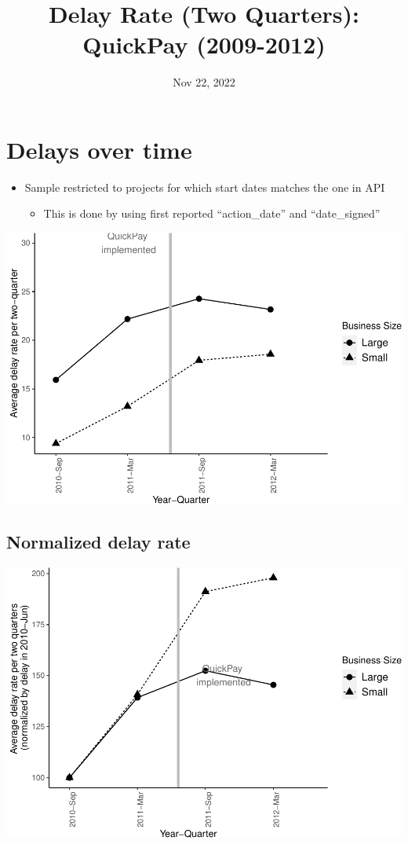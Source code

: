 \documentclass[
]{article}
\title{Delay Rate (Two Quarters): QuickPay (2009-2012)}
\author{}
\date{\vspace{-2.5em}Nov 22, 2022}
\providecommand{\tightlist}{%
  \setlength{\itemsep}{0pt}\setlength{\parskip}{0pt}}
\begin{document}
\maketitle

\hypertarget{delays-over-time}{%
\section{Delays over time}\label{delays-over-time}}

\begin{itemize}
\tightlist
\item
  Sample restricted to projects for which start dates matches the one in
  API

  \begin{itemize}
  \tightlist
  \item
    This is done by using first reported ``action\_date'' and
    ``date\_signed''
  \end{itemize}
\end{itemize}

\includegraphics{qp_first_delay_two_quarters_files/figure-latex/plot_pc_delay-1.pdf}

\hypertarget{normalized-delay-rate}{%
\subsection{Normalized delay rate}\label{normalized-delay-rate}}

\includegraphics{qp_first_delay_two_quarters_files/figure-latex/normalized_plot-1.pdf}
\end{document}
